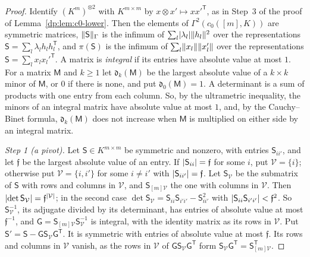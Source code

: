 \begin{proof}
Identify $(K^m)^{\otimes2}$ with $K^{m\times m}$ by $x\otimes x'\mapsto xx'^{\mathsf T}$, as in Step~3 of the proof of Lemma~\ref{dp:lem:c0-lower}. Then the elements of $\Gamma^2(c_0([m],K))$ are symmetric matrices, $\lVert \mathsf S\rVert_\Gamma$ is the infimum of $\sum_l\lvert \lambda_l\rvert\lVert h_l\rVert^2$ over the representations $\mathsf S=\sum_l\lambda_lh_lh_l^{\mathsf T}$, and $\pi(\mathsf S)$ is the infimum of $\sum_l\lVert x_l\rVert\lVert x'_l\rVert$ over the representations $\mathsf S=\sum_lx_lx_l'^{\mathsf T}$. A matrix is \emph{integral} if its entries have absolute value at most $1$. For a matrix $\mathsf M$ and $k\ge1$ let $\mathfrak d_k(\mathsf M)$ be the largest absolute value of a $k\times k$ minor of $\mathsf M$, or $0$ if there is none, and put $\mathfrak d_0(\mathsf M)=1$. A determinant is a sum of products with one entry from each column. So, by the ultrametric inequality, the minors of an integral matrix have absolute value at most $1$, and, by the Cauchy--Binet formula, $\mathfrak d_k(\mathsf M)$ does not increase when $\mathsf M$ is multiplied on either side by an integral matrix.

\emph{Step 1 (a pivot).} Let $\mathsf S\in K^{m\times m}$ be symmetric and nonzero, with entries $\mathsf S_{ii'}$, and let $\mathfrak f$ be the largest absolute value of an entry. If $\lvert \mathsf S_{ii}\rvert=\mathfrak f$ for some $i$, put $\mathcal V=\{i\}$; otherwise put $\mathcal V=\{i,i'\}$ for some $i\ne i'$ with $\lvert \mathsf S_{ii'}\rvert=\mathfrak f$. Let $\mathsf S_{\mathcal V}$ be the submatrix of $\mathsf S$ with rows and columns in $\mathcal V$, and $\mathsf S_{[m]\mathcal V}$ the one with columns in $\mathcal V$. Then $\lvert \det\mathsf S_{\mathcal V}\rvert=\mathfrak f^{\lvert \mathcal V\rvert}$; in the second case $\det\mathsf S_{\mathcal V}=\mathsf S_{ii}\mathsf S_{i'i'}-\mathsf S_{ii'}^2$ with $\lvert \mathsf S_{ii}\mathsf S_{i'i'}\rvert<\mathfrak f^2$. So $\mathsf S_{\mathcal V}^{-1}$, its adjugate divided by its determinant, has entries of absolute value at most $\mathfrak f^{-1}$, and $\mathsf G=\mathsf S_{[m]\mathcal V}\mathsf S_{\mathcal V}^{-1}$ is integral, with the identity matrix as its rows in $\mathcal V$. Put $\mathsf S'=\mathsf S-\mathsf G\mathsf S_{\mathcal V}\mathsf G^{\mathsf T}$. It is symmetric with entries of absolute value at most $\mathfrak f$. Its rows and columns in $\mathcal V$ vanish, as the rows in $\mathcal V$ of $\mathsf G\mathsf S_{\mathcal V}\mathsf G^{\mathsf T}$ form $\mathsf S_{\mathcal V}\mathsf G^{\mathsf T}=\mathsf S_{[m]\mathcal V}^{\mathsf T}$.


\end{proof}
